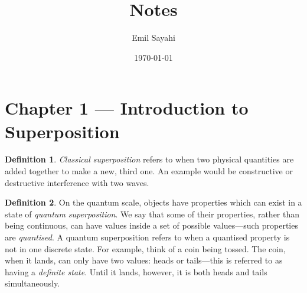 \documentclass{article}
\title{Notes}
\author{Emil Sayahi}
\date{\today}
\theoremstyle{definition}
\newtheorem{definition}{Definition}[section]
\begin{document}
\maketitle









\section{Chapter 1 --- Introduction to Superposition}

\begin{definition}
    \emph{Classical superposition} refers to when two physical quantities are added together to make a new, third one. An example would be constructive or destructive interference with two waves.
\end{definition}
\begin{definition}
    On the quantum scale, objects have properties which can exist in a state of \emph{quantum superposition}. We say that some of their properties, rather than being continuous, can have values inside a set of possible values---such properties are \emph{quantised}. A quantum superposition refers to when a quantised property is not in one discrete state. For example, think of a coin being tossed. The coin, when it lands, can only have two values: heads or tails---this is referred to as having a \emph{definite state}. Until it lands, however, it is both heads and tails simultaneously.
\end{definition}
\end{document}
